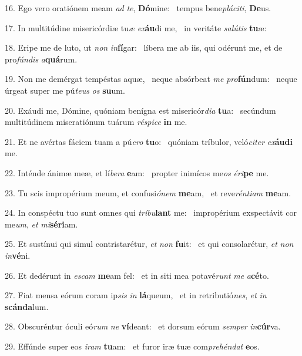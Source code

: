 16. Ego vero oratiónem meam \textit{ad} \textit{te}, \textbf{Dó}mine: \ast\  tempus bene\textit{plá}\textit{ci}\textit{ti}, \textbf{De}us.\

17. In multitúdine misericórdiæ tu\textit{æ} \textit{ex}\textbf{áu}di me, \ast\  in veritáte \textit{sa}\textit{lú}\textit{tis} \textbf{tu}æ:\

18. Eripe me de luto, ut \textit{non} \textit{in}\textbf{fí}gar: \ast\  líbera me ab iis, qui odérunt me, et de pro\textit{fún}\textit{dis} \textit{a}\textbf{quá}rum.\

19. Non me demérgat tempéstas aquæ, \dag\  neque absórbeat \textit{me} \textit{pro}\textbf{fún}dum: \ast\  neque úrgeat super me pú\textit{te}\textit{us} \textit{os} \textbf{su}um.\

20. Exáudi me, Dómine, quóniam benígna est misericór\textit{di}\textit{a} \textbf{tu}a: \ast\  secúndum multitúdinem miseratiónum tuárum \textit{ré}\textit{spi}\textit{ce} \textbf{in} me.\

21. Et ne avértas fáciem tuam a pú\textit{e}\textit{ro} \textbf{tu}o: \ast\  quóniam tríbulor, veló\textit{ci}\textit{ter} \textit{ex}\textbf{áu}\textbf{di} me.\

22. Inténde ánimæ meæ, et lí\textit{be}\textit{ra} \textbf{e}am: \ast\  propter inimícos me\textit{os} \textit{é}\textit{ri}\textbf{pe} me.\

23. Tu scis impropérium meum, et confusi\textit{ó}\textit{nem} \textbf{me}am, \ast\  et reve\textit{rén}\textit{ti}\textit{am} \textbf{me}am.\

24. In conspéctu tuo sunt omnes qui \textit{trí}\textit{bu}\textbf{lant} me: \ast\  impropérium exspectávit cor me\textit{um}, \textit{et} \textit{mi}\textbf{sé}\textbf{ri}am.\

25. Et sustínui qui simul contristarétur, \textit{et} \textit{non} \textbf{fu}it: \ast\  et qui consolarétur, \textit{et} \textit{non} \textit{in}\textbf{vé}ni.\

26. Et dedérunt in \textit{es}\textit{cam} \textbf{me}am fel: \ast\  et in siti mea potavé\textit{runt} \textit{me} \textit{a}\textbf{cé}to.\

27. Fiat mensa eórum coram ip\textit{sis} \textit{in} \textbf{lá}queum, \ast\  et in retributió\textit{nes}, \textit{et} \textit{in} \textbf{scán}\textbf{da}lum.\

28. Obscuréntur óculi eó\textit{rum} \textit{ne} \textbf{ví}deant: \ast\  et dorsum eórum \textit{sem}\textit{per} \textit{in}\textbf{cúr}va.\

29. Effúnde super eos \textit{i}\textit{ram} \textbf{tu}am: \ast\  et furor iræ tuæ com\textit{pre}\textit{hén}\textit{dat} \textbf{e}os.\

